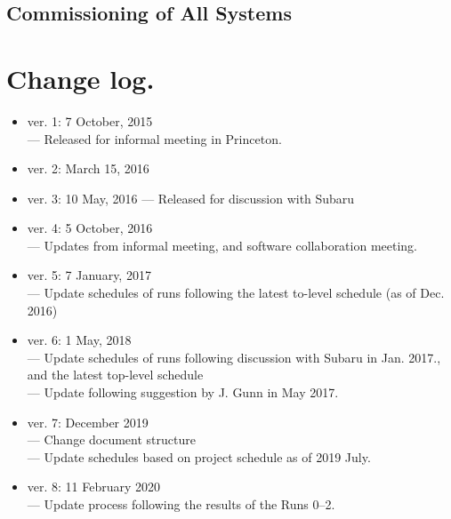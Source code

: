 \documentclass[11pt]{article}
\begin{document}
\renewcommand{\thesubsubsection}{A-\;\arabic{subsubsection}}
\subsection{Commissioning of All Systems}\label{sec:All}


%





\clearpage



\clearpage

%

\clearpage

\appendix



\section*{Change log.}
\begin{itemize}
\item ver. 1: 7 October, 2015 \\
--- Released for informal meeting in Princeton.
\item ver. 2:  March 15, 2016
\item ver. 3: 10 May, 2016
--- Released for discussion with Subaru
\item ver. 4: 5 October, 2016 \\
--- Updates from informal meeting, and software collaboration meeting.
\item ver. 5: 7 January, 2017 \\
--- Update schedules of runs following the latest to-level schedule (as of Dec. 2016)
\item ver. 6: 1 May, 2018 \\
--- Update schedules of runs following discussion with Subaru in Jan. 2017., and the latest top-level schedule \\
--- Update following suggestion by J. Gunn in May 2017.
\item ver. 7: December 2019 \\
--- Change document structure \\
--- Update schedules based on project schedule as of 2019 July.
\item ver. 8: 11 February 2020 \\
--- Update process following the results of the Runs 0--2.
\end{itemize}
\end{document}
